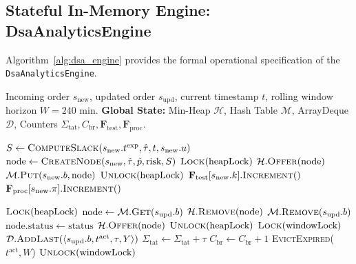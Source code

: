 \documentclass[conference]{IEEEtran}
\begin{document}
\subsection{Stateful In-Memory Engine: DsaAnalyticsEngine}
Algorithm~\ref{alg:dsa_engine} provides the formal operational specification of the \texttt{DsaAnalyticsEngine}.

\begin{algorithm}[t]
\caption{Stateful In-Memory DSA Triage \& Sliding Window Engine}
\label{alg:dsa_engine}
\begin{algorithmic}[1]
\REQUIRE Incoming order $s_{\text{new}}$, updated order $s_{\text{upd}}$, current timestamp $t$, rolling window horizon $W = 240\text{ min}$.
\STATE \textbf{Global State:} Min-Heap $\mathcal{H}$, Hash Table $\mathcal{M}$, ArrayDeque $\mathcal{D}$, Counters $\Sigma_{\text{tat}}, C_{\text{br}}, \mathbf{F}_{\text{test}}, \mathbf{F}_{\text{proc}}$.

    \STATE $S \leftarrow \textsc{ComputeSlack}(s_{\text{new}}.t^{\text{exp}}, \hat{\tau}, t, s_{\text{new}}.u)$ 
    \STATE $\text{node} \leftarrow \textsc{CreateNode}(s_{\text{new}}, \hat{\tau}, \hat{p}, \text{risk}, S)$
    \STATE $\textsc{Lock}(\text{heapLock})$
    \STATE $\mathcal{H}.\textsc{Offer}(\text{node})$ 
    \STATE $\mathcal{M}.\textsc{Put}(s_{\text{new}}.b, \text{node})$ 
    \STATE $\textsc{Unlock}(\text{heapLock})$
    \STATE $\mathbf{F}_{\text{test}}[s_{\text{new}}.k].\textsc{Increment}()$ 
    \STATE $\mathbf{F}_{\text{proc}}[s_{\text{new}}.\pi].\textsc{Increment}()$ 
\endPROCEDURE

    \STATE $\textsc{Lock}(\text{heapLock})$
    \STATE $\text{node} \leftarrow \mathcal{M}.\textsc{Get}(s_{\text{upd}}.b)$
        \STATE $\mathcal{H}.\textsc{Remove}(\text{node})$
            \STATE $\mathcal{M}.\textsc{Remove}(s_{\text{upd}}.b)$
        \ELSE
            \STATE $\text{node}.\text{status} \leftarrow \text{status}$
            \STATE $\mathcal{H}.\textsc{Offer}(\text{node})$ 
        \ENDIF
    \ENDIF
    \STATE $\textsc{Unlock}(\text{heapLock})$
        \STATE $\textsc{Lock}(\text{windowLock})$
        \STATE $\mathcal{D}.\textsc{AddLast}(\langle s_{\text{upd}}.b, t^{\text{act}}, \tau, Y \rangle)$
        \STATE $\Sigma_{\text{tat}} \leftarrow \Sigma_{\text{tat}} + \tau$
            \STATE $C_{\text{br}} \leftarrow C_{\text{br}} + 1$
        \ENDIF
        \STATE \textsc{EvictExpired}($t^{\text{act}}, W$)
        \STATE $\textsc{Unlock}(\text{windowLock})$
    \ENDIF
\endPROCEDURE


\end{algorithmic}
\end{algorithm}
\end{document}
